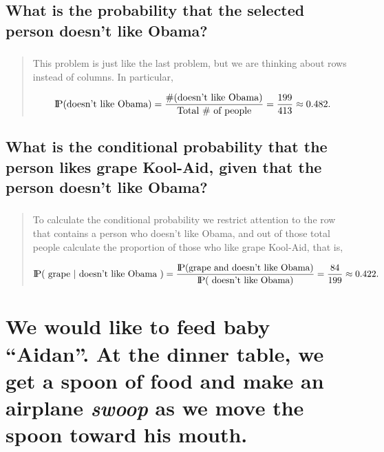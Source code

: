 \documentclass[11pt]{article}
\begin{document}
\subsection[What is the probability that the selected person doesn't like Obama?]{What is the probability that the selected person doesn't like Obama?}
\label{sec-1-2}
\subsubsection[]{}
\label{sec-1-2-1}
\begin{quote}
This problem is just like the last problem, but we are thinking about rows instead of columns. In particular,

\[
\P( \mbox{doesn't like Obama}) = \frac{\mbox{\#(doesn't like Obama)}}{\mbox{Total \# of people}} = \frac{199}{413}\approx 0.482.
\]

\end{quote}
\subsection[What is the conditional probability that the person likes grape Kool-Aid, given that the person doesn't like Obama?]{What is the conditional probability that the person likes grape Kool-Aid, given that the person doesn't like Obama?}
\label{sec-1-3}
\subsubsection[]{}
\label{sec-1-3-1}
\begin{quote}
To calculate the conditional probability we restrict attention to the row that contains a person who doesn't like Obama, and out of those total people calculate the proportion of those who like grape Kool-Aid, that is,

\[
\P( \mbox{ grape } \vert \mbox{ doesn't like Obama } ) = \frac{\P( \mbox{grape and doesn't like Obama} )}{\P(\mbox{ doesn't like Obama} ) } = \frac{84}{199} \approx 0.422.
\]

\end{quote}
\section[We would like to feed baby ``Aidan''. At the dinner table, we get a spoon of food and make an airplane \emph{swoop} as we move the spoon toward his mouth.]{We would like to feed baby ``Aidan''. At the dinner table, we get a spoon of food and make an airplane \emph{swoop} as we move the spoon toward his mouth.}
\label{sec-2}
\end{document}

